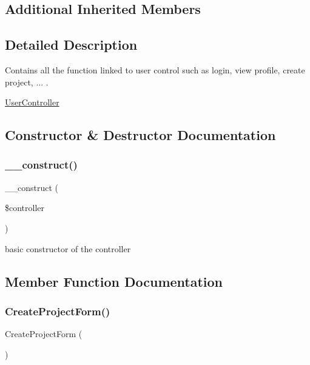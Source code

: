 \subsection*{Additional Inherited Members}


\subsection{Detailed Description}
Contains all the function linked to user control such as login, view profile, create project, ... . 

\hyperlink{class_user_controller}{User\+Controller} 

\subsection{Constructor \& Destructor Documentation}
\mbox{\label{class_user_controller_ad717f2a6a729542cf8f99500814c6cec}} 
\subsubsection{\texorpdfstring{\+\_\+\+\_\+construct()}{\_\_construct()}}
{\footnotesize\ttfamily \+\_\+\+\_\+construct (\begin{DoxyParamCaption}\item[{}]{\$controller }\end{DoxyParamCaption})}



basic constructor of the controller 



\subsection{Member Function Documentation}
\mbox{\label{class_user_controller_aaffeeb810115d6a6bce503694b762838}} 
\subsubsection{\texorpdfstring{Create\+Project\+Form()}{CreateProjectForm()}}
{\footnotesize\ttfamily Create\+Project\+Form (\begin{DoxyParamCaption}{ }\end{DoxyParamCaption})}



